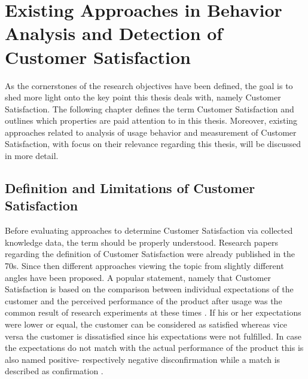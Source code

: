 \chapter{Existing Approaches in Behavior Analysis and Detection of Customer Satisfaction}
\label{ch:backgroundResearch}
As the cornerstones of the research objectives have been defined, the goal is to shed more light onto the key point this thesis deals with, namely Customer Satisfaction. The following chapter defines the term Customer Satisfaction and outlines which properties are paid attention to in this thesis. Moreover, existing approaches related to analysis of usage behavior and measurement of Customer Satisfaction, with focus on their relevance regarding this thesis, will be discussed in more detail.

\section{Definition and Limitations of Customer Satisfaction}
\label{sec:custSatisfactionDefinition}
Before evaluating approaches to determine Customer Satisfaction via collected knowledge data, the term should be properly understood. Research papers regarding the definition of Customer Satisfaction were already published in the 70s. Since then different approaches viewing the topic from slightly different angles have been proposed. A popular statement, namely that Customer Satisfaction is based on the comparison between individual expectations of the customer and the perceived performance of the product after usage was the common result of research experiments at these times \cite{oliver1977effect} \cite{anderson1973consumer}. If his or her expectations were lower or equal, the customer can be considered as satisfied whereas vice versa the customer is dissatisfied since his expectations were not fulfilled. In case the expectations do not match with the actual performance of the product this is also named positive- respectively negative disconfirmation while a match is described as confirmation \cite{oliver1977effect} \cite{anderson1973consumer}.

